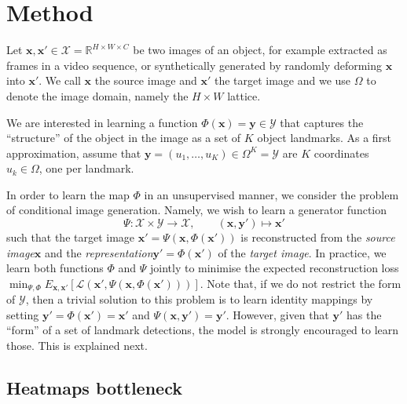 \documentclass{article}
\newcommand{\bx}{\mathbf{x}}
\newcommand{\by}{\mathbf{y}}
\begin{document}
\section{Method}\label{s:method}

Let $\bx,\bx'\in \mathcal{X}=\mathbb{R}^{H\times W\times C}$ be two images of an object, for example extracted as frames in a video sequence, or synthetically generated by randomly deforming $\bx$ into $\bx'$. We call $\bx$ the source image and $\bx'$ the target image and we use $\Omega$ to denote the image domain, namely the $H{\times}W$ lattice.

We are interested in learning a function $\Phi(\bx)=\by\in\mathcal{Y}$ that captures the ``structure'' of the object in the image as a set of $K$ object landmarks. As a first approximation, assume that $\by = (u_1,\dots,u_K) \in \Omega^K = \mathcal{Y}$ are $K$ coordinates $u_k\in\Omega$, one per landmark.

In order to learn the map $\Phi$ in an unsupervised manner, we consider the problem of conditional image generation. Namely, we wish to learn a generator function
$$
 \Psi : \mathcal{X} \times \mathcal{Y} \rightarrow \mathcal{X},
 \qquad
 (\bx,\by') \mapsto \bx'
$$
such that the target image $\bx' = \Psi(\bx,\Phi(\bx'))$ is reconstructed from the \emph{source image}$\bx$ and the \emph{representation}$\by'=\Phi(\bx')$ of the \emph{target image}. In practice, we learn both functions $\Phi$ and $\Psi$ jointly to minimise the expected reconstruction loss
$
 \min_{\Psi,\Phi} E_{\bx,\bx'}
 \left[
 \mathcal{L}(\bx', \Psi(\bx,\Phi(\bx')))
 \right].
$
Note that, if we do not restrict the form of $\mathcal{Y}$, then a trivial solution to this problem is to learn identity mappings by setting $\by' = \Phi(\bx') = \bx'$ and $\Psi(\bx,\by')=\by'$. However, given that $\by'$ has the ``form'' of a set of landmark detections, the model is strongly encouraged to learn those. This is explained next.

\subsection{Heatmaps bottleneck}\label{s:heatmaps}
\end{document}
